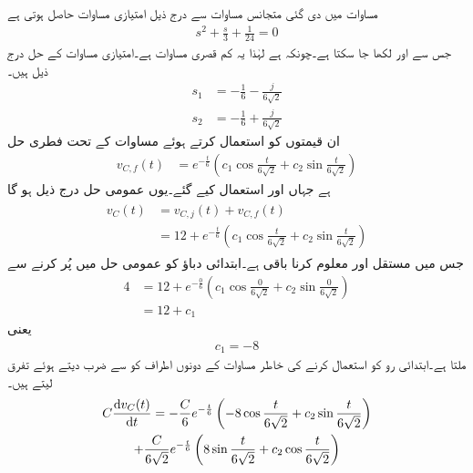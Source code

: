 مساوات  میں دی گئی متجانس مساوات سے درج ذیل امتیازی مساوات حاصل ہوتی ہے
\begin{align*}
s^2+\frac{s}{3}+\frac{1}{24}=0
\end{align*}
جس سے  اور  لکھا جا سکتا ہے۔چونکہ  ہے لہٰذا یہ کم قصری مساوات ہے۔امتیازی مساوات کے حل درج ذیل ہیں۔
\begin{align*}
s_1&=-\frac{1}{6}-\frac{j}{6\sqrt{2}}\\
s_2&=-\frac{1}{6}+\frac{j}{6\sqrt{2}}
\end{align*}
ان قیمتوں کو استعمال کرتے ہوئے  مساوات  کے تحت فطری حل
\begin{align*}
v_{C,f}(t)&=e^{-\frac{t}{6}}\left(c_1 \cos \frac{t}{6\sqrt{2}}+c_2 \sin \frac{t}{6\sqrt{2}}\right)
\end{align*}
ہے جہاں  اور  استعمال کیے گئے۔یوں عمومی حل درج ذیل ہو گا
\begin{gather}
\begin{aligned}\label{مساوات_عارضی_سلسلہ_وار_مکمل_حل_الف}
v_C(t)&=v_{C,j}(t)+v_{C,f}(t)\\
&=12+e^{-\frac{t}{6}}\left(c_1 \cos \frac{t}{6\sqrt{2}}+c_2 \sin \frac{t}{6\sqrt{2}}\right)
\end{aligned}
\end{gather}
جس میں مستقل  اور  معلوم کرنا باقی ہے۔ابتدائی دباؤ  کو عمومی حل میں پُر کرنے سے
\begin{align*}
4&=12+e^{-\frac{0}{6}}\left(c_1 \cos \frac{0}{6\sqrt{2}}+c_2 \sin \frac{0}{6\sqrt{2}}\right)\\
&=12+c_1
\end{align*}
یعنی
\begin{align}\label{مساوات_عارضی_مستقل_الف}
c_1=-8
\end{align}
ملتا ہے۔ابتدائی رو  کو استعمال کرنے کی خاطر مساوات  کے دونوں اطراف کو  سے ضرب دیتے ہوئے تفرق لیتے ہیں۔
\begin{multline*}
C \frac{\dif v_C(t)}{\dif t}=-\frac{C}{6}e^{-\frac{t}{6}}\left(-8 \cos \frac{t}{6\sqrt{2}}+c_2 \sin \frac{t}{6\sqrt{2}}\right)\\+\frac{C}{6\sqrt{2}}e^{-\frac{t}{6}}\left(8 \sin \frac{t}{6\sqrt{2}}+c_2 \cos \frac{t}{6\sqrt{2}}\right)
\end{multline*}
